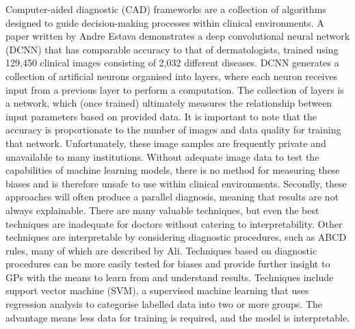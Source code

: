 Computer-aided diagnostic (CAD) frameworks are a collection of algorithms designed to guide decision-making processes within clinical environments\cite{Dick2019}. A paper written by Andre Estava demonstrates a deep convolutional neural network (DCNN) that has comparable accuracy to that of dermatologists, trained using 129,450 clinical images consisting of 2,032 different diseases\cite{Andre2017}. DCNN generates a collection of artificial neurons organised into layers, where each neuron receives input from a previous layer to perform a computation. The collection of layers is a network, which (once trained) ultimately measures the relationship between input parameters based on provided data. It is important to note that the accuracy is proportionate to the number of images and data quality for training that network. Unfortunately, these image samples are frequently private and unavailable to many institutions. Without adequate image data to test the capabilities of machine learning models, there is no method for measuring these biases and is therefore unsafe to use within clinical environments. Secondly, these approaches will often produce a parallel diagnosis, meaning that results are not always explainable\cite{Lipton2018}. There are many valuable techniques, but even the best techniques are inadequate for doctors without catering to interpretability. Other techniques are interpretable by considering diagnostic procedures, such as ABCD rules, many of which are described by Ali\cite{Ali2020}. Techniques based on diagnostic procedures can be more easily tested for biases and provide further insight to GPs with the means to learn from and understand results. Techniques include support vector machine (SVM), a supervised machine learning that uses regression analysis to categorise labelled data into two or more groups. The advantage means less data for training is required, and the model is interpretable.


